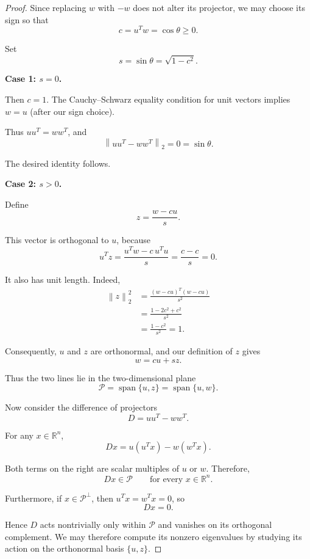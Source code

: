 \documentclass[14pt,letterpaper]{article}
\theoremstyle{plain}
\theoremstyle{definition}
\theoremstyle{remark}
\newcommand{\R}{\mathbb{R}}
\newcommand{\norm}[1]{\left\lVert #1 \right\rVert}
\DeclareMathOperator{\Span}{span}
\begin{document}
\begin{proof}

Since replacing $w$ with $-w$ does not alter its
projector, we may choose its sign so that
\[
c=u^Tw=\cos\theta\geq0.
\]

Set
\[
s=\sin\theta=\sqrt{1-c^2}.
\]

\noindent\textbf{Case 1: $s=0$.}

Then $c=1$. The Cauchy--Schwarz equality condition
for unit vectors implies $w=u$ (after our sign choice).

Thus $uu^T=ww^T$, and
\[
\norm{uu^T-ww^T}_2=0=\sin\theta.
\]

The desired identity follows.

\medskip

\noindent\textbf{Case 2: $s>0$.}

Define
\[
\boxed{
z=\frac{w-cu}{s}.
}
\]

This vector is orthogonal to $u$, because
\[
u^Tz
=\frac{u^Tw-c\,u^Tu}{s}
=\frac{c-c}{s}=0.
\]

It also has unit length. Indeed,
\[
\begin{aligned}
\norm{z}_2^2
&=\frac{(w-cu)^T(w-cu)}{s^2}\\
&=\frac{1-2c^2+c^2}{s^2}\\
&=\frac{1-c^2}{s^2}=1.
\end{aligned}
\]

Consequently, $u$ and $z$ are orthonormal, and
our definition of $z$ gives
\[
\boxed{w=cu+sz.}
\]

Thus the two lines lie in the two-dimensional plane
\[
\mathcal P=\Span\{u,z\}=\Span\{u,w\}.
\]


Now consider the difference of projectors
\[
D=uu^T-ww^T.
\]

For any $x\in\R^n$,
\[
\boxed{
Dx=u(u^Tx)-w(w^Tx).
}
\]

Both terms on the right are scalar multiples of
$u$ or $w$. Therefore,
\[
Dx\in\mathcal P
\qquad\text{for every }x\in\R^n.
\]

Furthermore, if $x\in\mathcal P^\perp$, then
$u^Tx=w^Tx=0$, so
\[
Dx=0.
\]

Hence $D$ acts nontrivially only within $\mathcal P$
and vanishes on its orthogonal complement. We may
therefore compute its nonzero eigenvalues by studying
its action on the orthonormal basis $\{u,z\}$.


\end{proof}
\end{document}
